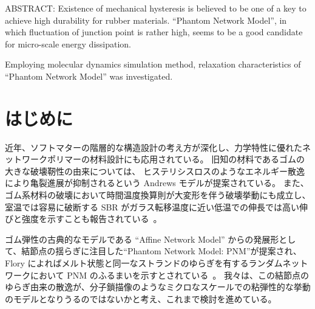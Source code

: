 \documentclass[uplatex,10pt,a4paper,twocolumn]{jsarticle}
\begin{document}


\begin{spacing}{0.95}
ABSTRACT: 
Existence of mechanical hysteresis is believed to be one of a key to achieve high durability for rubber materials.
``Phantom Network Model'', in which fluctuation of junction point is rather high, seems to be a good candidate for micro-scale energy dissipation.

Employing molecular dynamics simulation method, relaxation characteristics of ``Phantom Network Model'' was investigated.
\end{spacing}

\section{はじめに}
近年、ソフトマターの階層的な構造設計の考え方が深化し、力学特性に優れたネットワークポリマーの材料設計にも応用されている。
旧知の材料であるゴムの大きな破壊靭性の由来については、 ヒステリシスロスのようなエネルギー散逸により亀裂進展が抑制されるという Andrews モデルが提案されている\cite{andrews}。
また、ゴム系材料の破壊において時間温度換算則が大変形を伴う破壊挙動にも成立し、室温では容易に破断する SBR がガラス転移温度に近い低温での伸長では高い伸びと強度を示すことも報告されている~\cite{smith}。

ゴム弾性の古典的なモデルである ``Affine Network Model'' からの発展形として、結節点の揺らぎに注目した``Phantom Network Model: PNM''が提案され、Flory によればメルト状態と同一なストランドのゆらぎを有するランダムネットワークにおいて PNM のふるまいを示すとされている~\cite{flory}。
我々は、この結節点のゆらぎ由来の散逸が、分子鎖描像のようなミクロなスケールでの粘弾性的な挙動のモデルとなりうるのではないかと考え、これまで検討を進めている。
\end{document}
